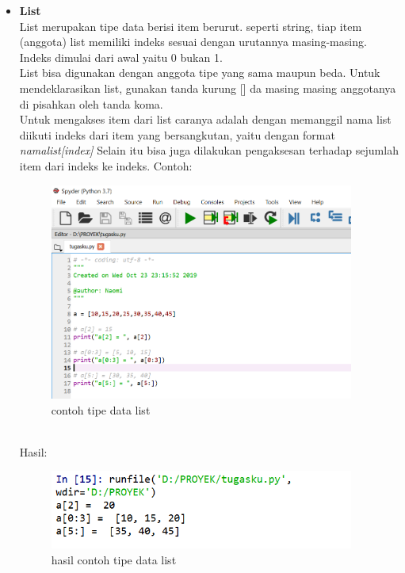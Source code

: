 \begin{enumerate}
\begin{itemize}
\item \textbf{List}\\
List merupakan tipe data berisi item berurut. seperti string, tiap item (anggota) list memiliki indeks sesuai dengan urutannya masing-masing. Indeks dimulai dari awal yaitu 0 bukan 1.\\
List bisa digunakan dengan anggota tipe yang sama maupun beda. Untuk mendeklarasikan list, gunakan tanda kurung [] da masing masing anggotanya di pisahkan oleh tanda koma. \\ Untuk mengakses item dari list caranya adalah dengan memanggil nama list diikuti indeks dari item yang bersangkutan, yaitu dengan format \textit{namalist[index]} Selain itu bisa juga dilakukan pengaksesan terhadap sejumlah item dari indeks ke indeks. Contoh: \\
						\begin{figure}[!htbp]
							\centering
											\includegraphics[width=10cm]{gambar2/cth4.png}
							\caption{contoh tipe data list}
							\end{figure}\\
Hasil:
 						\begin{figure}[!htbp]
							\centering
							\includegraphics[width=10cm]{gambar2/hsl4.png}
							\caption{hasil contoh tipe data list}
							\end{figure}
							

\end{itemize}
\end{enumerate}
